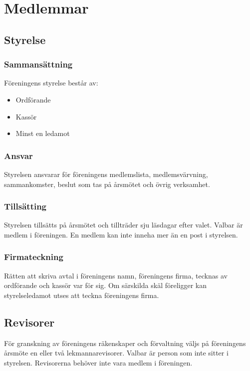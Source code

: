 \section{Medlemmar}

\subsection{Styrelse} \label{sec:sammansättning-styrelse}

\subsubsection{Sammansättning} 
Föreningens styrelse består av:
\begin{itemize}
    \item Ordförande
    \item Kassör
    \item Minst en ledamot
\end{itemize}

\subsubsection{Ansvar}
Styrelsen ansvarar för föreningens medlemslista, medlemsvärvning, sammankomster, beslut som tas på årsmötet och övrig verksamhet.

\subsubsection{Tillsätting}
Styrelsen tillsätts på årsmötet och tillträder sju läsdagar efter valet. Valbar är medlem i föreningen. En medlem kan inte inneha mer än en post i styrelsen.

\subsubsection{Firmateckning}
Rätten att skriva avtal i föreningens namn, föreningens firma, tecknas av ordförande och kassör var för sig. Om särskilda skäl föreligger kan styrelseledamot utses att teckna föreningens firma.




\subsection{Revisorer}
För granskning av föreningens räkenskaper och förvaltning väljs på föreningens årsmöte en eller två lekmannarevisorer. Valbar är person som inte sitter i styrelsen. Revisorerna behöver inte vara medlem i föreningen.



